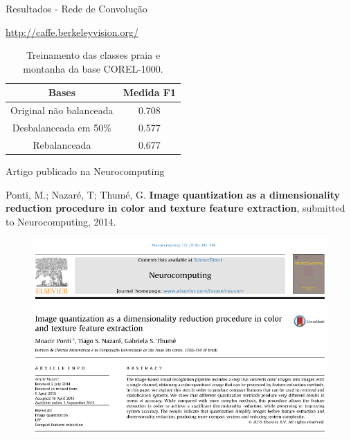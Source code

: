 \documentclass{beamer}
\begin{document}
\begin{frame}{Resultados - Rede de Convolução}
\begin{table}
\url{http://caffe.berkeleyvision.org/}
\caption{Treinamento das classes praia e montanha da base COREL-1000.}
  \begin{tabular}{c|c}
    Bases    &   Medida F1 \\ \hline
    Original não balanceada     &   0.708  \\
    Desbalanceada em 50\% &   0.577  \\
    Rebalanceada  &   0.677  \\
  \end{tabular}
\end{table}
\end{frame}
\begin{frame}{Artigo publicado na Neurocomputing}

\begin{block}{}
\justifying
\tiny{
Ponti, M.; Nazaré, T; Thumé, G. \textbf{Image quantization as a dimensionality reduction procedure in color and texture feature extraction}, submitted to Neurocomputing, 2014.}
\end{block}
\begin{figure}
  \begin{center}
    \includegraphics[width=0.7\linewidth]{figuras/artigo.png}
  \end{center}
\end{figure}
\end{frame}
\end{document}
